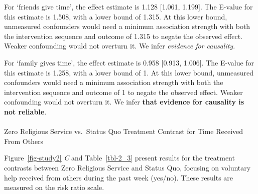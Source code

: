 \documentclass[
  single column]{article}
\makeatletter
\let\oldparagraph\paragraph
\renewcommand{\paragraph}{
    \@ifstar
      \xxxParagraphStar
      \xxxParagraphNoStar
  }
\newcommand{\xxxParagraphStar}[1]{\oldparagraph*{#1}\mbox{}}
\newcommand{\xxxParagraphNoStar}[1]{\oldparagraph{#1}\mbox{}}
\makeatother
\begin{document}
For `friends give time', the effect estimate is 1.128 {[}1.061,
1.199{]}. The E-value for this estimate is 1.508, with a lower bound of
1.315. At this lower bound, unmeasured confounders would need a minimum
association strength with both the intervention sequence and outcome of
1.315 to negate the observed effect. Weaker confounding would not
overturn it. We infer \emph{evidence for causality}.

For `family gives time', the effect estimate is 0.958 {[}0.913,
1.006{]}. The E-value for this estimate is 1.258, with a lower bound of
1. At this lower bound, unmeasured confounders would need a minimum
association strength with both the intervention sequence and outcome of
1 to negate the observed effect. Weaker confounding would not overturn
it. We infer \textbf{that evidence for causality is not reliable}.

\paragraph{Zero Religious Service vs.~Status Quo Treatment Contrast for
Time Received From
Others}\label{zero-religious-service-vs.-status-quo-treatment-contrast-for-time-received-from-others}

Figure~\ref{fig-study2} \emph{C} and Table~\ref{tbl-2_3} present results
for the treatment contrasts between Zero Religious Service and Status
Quo, focusing on voluntary help received from others during the past
week (yes/no). These results are measured on the risk ratio scale.
\end{document}
